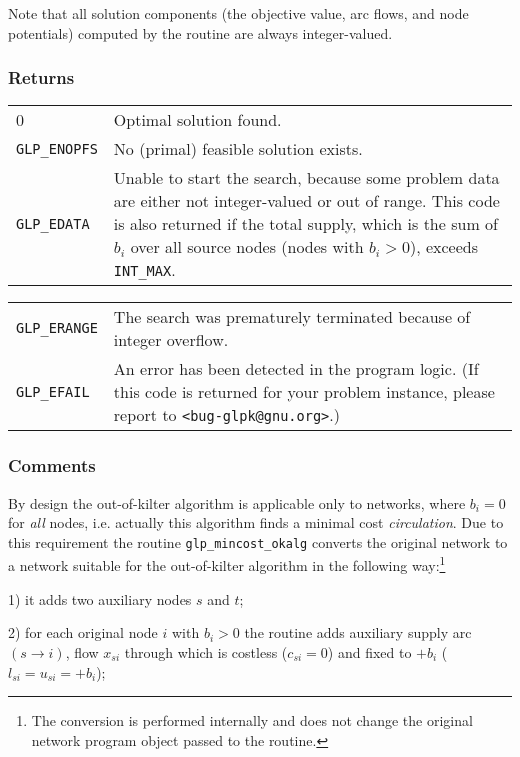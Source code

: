 \documentclass[dvipdfm,11pt]{report}
\begin{document}
Note that all solution components (the objective value, arc flows, and
node potentials) computed by the routine are always integer-valued.

\subsubsection*{Returns}

\def\arraystretch{1}

\begin{tabular}{@{}p{25mm}p{97.3mm}@{}}
0 & Optimal solution found.\\
\verb|GLP_ENOPFS| & No (primal) feasible solution exists.\\
\verb|GLP_EDATA| & Unable to start the search, because some problem
data are either not integer-valued or out of range. This code is also
returned if the total supply, which is the sum of $b_i$ over all source
nodes (nodes with $b_i>0$), exceeds \verb|INT_MAX|.\\
\end{tabular}

\noindent
\begin{tabular}{@{}p{25mm}p{97.3mm}@{}}
\verb|GLP_ERANGE| & The search was prematurely terminated because of
integer overflow.\\
\verb|GLP_EFAIL| & An error has been detected in the program logic.
(If this code is returned for your problem instance, please report to
\verb|<bug-glpk@gnu.org>|.)\\
\end{tabular}

\subsubsection*{Comments}

By design the out-of-kilter algorithm is applicable only to networks,
where $b_i=0$ for {\it all} nodes, i.e. actually this algorithm finds a
minimal cost {\it circulation}. Due to this requirement the routine
\verb|glp_mincost_okalg| converts the original network to a network
suitable for the out-of-kilter algorithm in the following
way:\footnote{The conversion is performed internally and does not change
the original network program object passed to the routine.}

1) it adds two auxiliary nodes $s$ and $t$;

2) for each original node $i$ with $b_i>0$ the routine adds auxiliary
supply arc $(s\rightarrow i)$, flow $x_{si}$ through which is costless
($c_{si}=0$) and fixed to $+b_i$ ($l_{si}=u_{si}=+b_i$);
\end{document}
